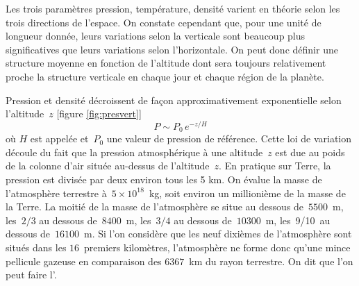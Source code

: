 \sk
Les trois paramètres pression, température, densité varient en théorie selon les trois directions de l'espace. On constate cependant que, pour une unité de longueur donnée, leurs variations selon la verticale sont beaucoup plus significatives que leurs variations selon l'horizontale. On peut donc définir une structure moyenne en fonction de l'altitude dont sera toujours relativement proche la structure verticale en chaque jour et chaque région de la planète. 


\sk
Pression et densité décroissent de façon approximativement exponentielle selon l'altitude~$z$ [figure \ref{fig:presvert}] $$ P\sim P_0 \, e^{-z/H} $$ où $H$ est appelée  et~$P_0$ une valeur de pression de référence. Cette loi de variation découle du fait que la pression atmosphérique à une altitude~$z$ est due au poids de la colonne d'air située au-dessus de l'altitude~$z$. En pratique sur Terre, la pression est divisée par deux environ tous les 5 km. On évalue la masse de l'atmosphère terrestre à~$5 \times 10^{18}$~kg, soit environ un millionième de la masse de la Terre. La moitié de la masse de l'atmosphère se situe au dessous de~$5500$~m, les~$2/3$ au dessous de~$8400$~m, les~$3/4$ au dessous de~$10300$~m, les~9/10~au dessous de~$16100$~m. Si l'on considère que les neuf dixièmes de l’atmosphère sont situés dans les $16$~premiers kilomètres, l’atmosphère ne forme donc qu'une mince pellicule gazeuse en comparaison des $6367$~km du rayon terrestre. On dit que l'on peut faire l'.
